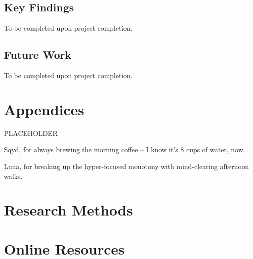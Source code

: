 \documentclass[sigconf]{acmart}
\begin{document}
\subsection{Key Findings}
To be completed upon project completion.
\subsection{Future Work}
To be completed upon project completion.

\section{Appendices}
PLACEHOLDER


\begin{acks}
Sqyd, for always brewing the morning coffee -- I know it's 8 cups of water, now.

Luna, for breaking up the hyper-focused monotony with mind-clearing afternoon walks.
\end{acks}





\appendix

\section{Research Methods}

\section{Online Resources}
\end{document}
